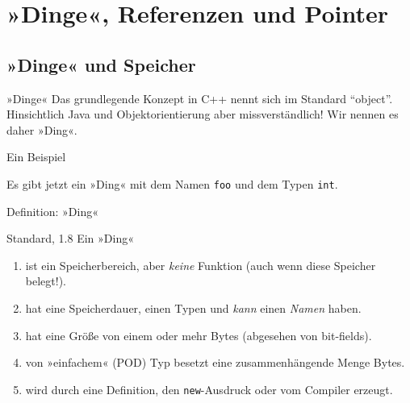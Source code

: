 \section{»Dinge«, Referenzen und Pointer}


\subsection{»Dinge« und Speicher}

\begin{frame}[fragile]{»Dinge«}
	Das grundlegende Konzept in C++ nennt sich im Standard \enquote{object}. Hinsichtlich Java und Objektorientierung aber missverständlich!
	Wir nennen es daher »Ding«.
	
	\pause
	\vspace{2em}
	
	{\footnotesize
	\begin{block}{Ein Beispiel}
		
		Es gibt jetzt ein »Ding« mit dem Namen \verb|foo| und dem Typen \verb|int|.
	\end{block}
	}
\end{frame}

\begin{frame}[fragile]{Definition: »Ding«}
	\begin{block}{Standard, 1.8}
		Ein »Ding«
		\begin{enumerate}
			\item<1-| alert@1> ist ein Speicherbereich, aber \emph{keine} Funktion {\tiny(auch wenn diese Speicher belegt!)}.
			\item<2-| alert@2> hat eine Speicherdauer, einen Typen und \emph{kann} einen \emph{Namen} haben.
			\item<3-> {\footnotesize hat eine Größe von einem oder mehr Bytes {\tiny (abgesehen von bit-fields)}.}
			\item<3-> {\footnotesize von »einfachem« {\tiny (POD)} Typ besetzt eine zusammenhängende Menge Bytes.}
			\item<3-> {\footnotesize wird durch eine Definition, den \verb|new|-Ausdruck oder vom Compiler erzeugt.}
		\end{enumerate}
	\end{block}
\end{frame}

